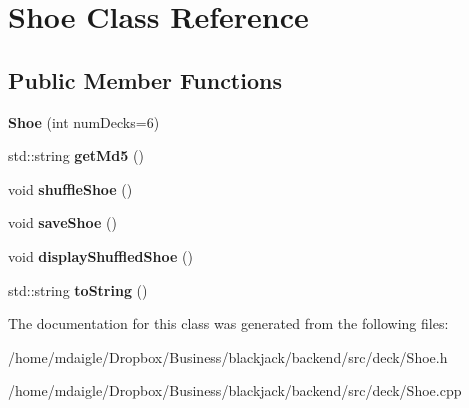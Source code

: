 \hypertarget{classShoe}{
\section{\-Shoe \-Class \-Reference}
\label{classShoe}
}
\subsection*{\-Public \-Member \-Functions}
\begin{DoxyCompactItemize}
\item 
\hypertarget{classShoe_aeb67304b8ef6ebac0b3216a560d82b08}{
{\bfseries \-Shoe} (int num\-Decks=6)}
\label{classShoe_aeb67304b8ef6ebac0b3216a560d82b08}

\item 
\hypertarget{classShoe_a5abb97969b12b705b3483f4416dfc1d5}{
std\-::string {\bfseries get\-Md5} ()}
\label{classShoe_a5abb97969b12b705b3483f4416dfc1d5}

\item 
\hypertarget{classShoe_abdf1c44268fc1af6256f3f98eddb63bf}{
void {\bfseries shuffle\-Shoe} ()}
\label{classShoe_abdf1c44268fc1af6256f3f98eddb63bf}

\item 
\hypertarget{classShoe_a65f8ef26fab739237b9292fbb34ca58f}{
void {\bfseries save\-Shoe} ()}
\label{classShoe_a65f8ef26fab739237b9292fbb34ca58f}

\item 
\hypertarget{classShoe_ac7ffcbc9ea83427b298a1b01c6aea7e0}{
void {\bfseries display\-Shuffled\-Shoe} ()}
\label{classShoe_ac7ffcbc9ea83427b298a1b01c6aea7e0}

\item 
\hypertarget{classShoe_ad894b6edf1e50aa8d9d13a0e00d58850}{
std\-::string {\bfseries to\-String} ()}
\label{classShoe_ad894b6edf1e50aa8d9d13a0e00d58850}

\end{DoxyCompactItemize}


\-The documentation for this class was generated from the following files\-:\begin{DoxyCompactItemize}
\item 
/home/mdaigle/\-Dropbox/\-Business/blackjack/backend/src/deck/\-Shoe.\-h\item 
/home/mdaigle/\-Dropbox/\-Business/blackjack/backend/src/deck/\-Shoe.\-cpp\end{DoxyCompactItemize}
